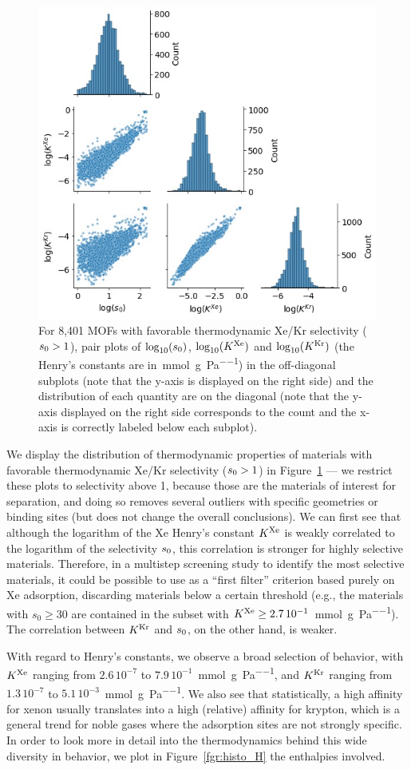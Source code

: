 \documentclass[main.tex]{subfiles}
\begin{document}
\begin{figure}[t]
\centering
  \includegraphics[width=0.6\linewidth]{figures/2-thermo/Henry_0.jpg}
  \caption{For 8,401 MOFs with favorable thermodynamic Xe/Kr selectivity ($s_{\text{0}} > 1$), pair plots of $\log_{\text{10}}(s_{\text{0}})$, $\log_{\text{10}}(K^{\text{Xe}})$ and $\log_{\text{10}}(K^{\text{Kr}})$ (the Henry's constants are in~\si{\milli\mol\per\gram\per\pascal}) in the off-diagonal subplots (note that the y-axis is displayed on the right side) and the distribution of each quantity are on the diagonal (note that the y-axis displayed on the right side corresponds to the count and the x-axis is correctly labeled below each subplot).}
  \label{fgr:histo_K}
\end{figure}


We display the distribution of thermodynamic properties of materials with favorable thermodynamic Xe/Kr selectivity ($s_{\text{0}} > 1$) in Figure~\ref{fgr:histo_K} --- we restrict these plots to selectivity above 1, because those are the materials of interest for separation, and doing so removes several outliers with specific geometries or binding sites (but does not change the overall conclusions). We can first see that although the logarithm of the Xe Henry's constant $K^{\text{Xe}}$ is weakly correlated to the logarithm of the selectivity $s_{\text{0}}$, this correlation is stronger for highly selective materials. Therefore, in a multistep screening study to identify the most selective materials, it could be possible to use as a ``first filter'' criterion based purely on Xe adsorption, discarding materials below a certain threshold (e.g., the materials with $s_0\ge30$ are contained in the subset with $K^{\text{Xe}}\ge2.7\,10^{-1}$~\si{\milli\mol\per\gram\per\pascal}). The correlation between $K^{\text{Kr}}$ and $s_{\text{0}}$, on the other hand, is weaker.

With regard to Henry's constants, we observe a broad selection of behavior, with $K^{\text{Xe}}$ ranging from $2.6\,10^{-7}$ to $7.9\,10^{-1}$~\si{\milli\mol\per\gram\per\pascal}, and $K^{\text{Kr}}$ ranging from $1.3\,10^{-7}$ to $5.1\,10^{-3}$~\si{\milli\mol\per\gram\per\pascal}. We also see that statistically, a high affinity for xenon usually translates into a high (relative) affinity for krypton, which is a general trend for noble gases where the adsorption sites are not strongly specific. In order to look more in detail into the thermodynamics behind this wide diversity in behavior, we plot in Figure~\ref{fgr:histo_H} the enthalpies involved.
\end{document}
